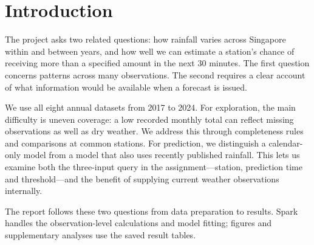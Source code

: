 \begin{abstract}
Singapore's five-minute rainfall records offer a detailed view of local weather, while uneven coverage affects comparisons over time. We analyse the 2017--2024 annual datasets with Apache Spark, retaining 48.54 million observations from 91 station IDs after cleaning. Among sufficiently complete station-months, November has the highest mean monthly rainfall and wet intervals are most frequent in the afternoon. For prediction, we compare random forests, gradient-boosted trees, logistic regression and historical frequencies under two information settings: recent station rainfall and station/calendar information alone. On 5.73 million shared 2024 test cases, the recent-rainfall forest achieves mean Brier 0.01613, compared with 0.02283 for the calendar forest. RF has the lowest observed mean Brier among the tested classifier pipelines; historical frequency performs best for calendar-only risk. A paired day-block analysis supports a small RF advantage over GBT with recent rainfall, while RF fitting fractions from 15\% to 100\% show no clear mean improvement. Gains are concentrated at low rainfall thresholds, and heavy-rain probability skill remains limited. Later experiments reuse 2024, so model selection remains exploratory. These results support the recent-rainfall RF as a reference model and motivate stronger validation and tail calibration.
\end{abstract}

\section{Introduction}
The project asks two related questions: how rainfall varies across Singapore within and between years, and how well we can estimate a station's chance of receiving more than a specified amount in the next 30 minutes. The first question concerns patterns across many observations. The second requires a clear account of what information would be available when a forecast is issued.

We use all eight annual datasets from 2017 to 2024. For exploration, the main difficulty is uneven coverage: a low recorded monthly total can reflect missing observations as well as dry weather. We address this through completeness rules and comparisons at common stations. For prediction, we distinguish a calendar-only model from a model that also uses recently published rainfall. This lets us examine both the three-input query in the assignment---station, prediction time and threshold---and the benefit of supplying current weather observations internally.

The report follows these two questions from data preparation to results. Spark handles the observation-level calculations and model fitting; figures and supplementary analyses use the saved result tables.

